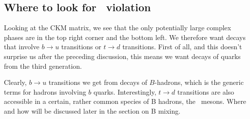\subsection{Where to look for \cp\ violation}
 Looking at the CKM matrix, we see that the only potentially large
 complex phases are in the top right corner and the bottom left. We
 therefore want decays that involve $b\to u$ transitions or $t\to d$
 transitions. First of all, and this doesn't surprise us after the
 preceding discussion, this means we want decays of quarks from the
 third generation.

 Clearly, $b \to u$ transitions we get from decays of $B$-hadrons,
 which is the generic terms for hadrons involving $b$
 quarks. Interestingly, $t \to d$ transitions are also accessible in a
 certain, rather common species of B hadrons, the \Bdo\ mesons. Where
 and how will be discussed later in the section on B mixing.


